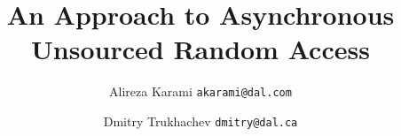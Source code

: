 \documentclass[journal,onecolumn,12pt]{IEEEtran}
\begin{document}
\parindent=5mm

\DeclarePairedDelimiter{\nint}\lfloor\rceil
\newcommand{\beq}{\begin{equation}}
\newcommand{\eeq}{\end{equation}}
\newcommand{\Hb}{\mathbf {H}}
\newcommand{\F}{\mathbf {F}}
\newcommand{\B}{\mathbf {B}}
\newcommand{\I}{\mathbf {I}}
\newcommand{\p}{\boldsymbol {p}}
\newcommand{\bv}{\boldsymbol {b}}
\newcommand{\matr}[1]{{\mathbf{#1}}}
\renewcommand{\vec}[1]{{\boldsymbol{#1}}}
\newcommand{\x}{\boldsymbol {x}}
\newcommand{\n}{\boldsymbol {n}}
\newcommand{\s}{\boldsymbol {s}}
\newcommand{\w}{\boldsymbol {w}}
\newcommand{\vv}{\boldsymbol {v}}
\newcommand{\cx}{\boldsymbol {c}}
\newcommand{\rx}{\boldsymbol {r}}
\newcommand{\y}{\boldsymbol {y}}
\newcommand{\z}{\boldsymbol {z}}
\newcommand{\R}{\mathbf {R}}
\newcommand{\A}{\mathbf {A}}
\newcommand{\mL}{\mathcal{L}}
\newcommand{\raw}{\rightarrow}

\newtheorem{lemma}{Lemma}
\newtheorem{theorem}{Theorem}
\newcommand{\gvect}[1]{{\boldsymbol{#1}}} %
\newcommand{\pound}{\operatornamewithlimits{\#}}
\newcommand{\stxt}[1]{\ensuremath{_{\text{#1}}}}
\renewcommand{\topfraction}{1}	%
\renewcommand{\bottomfraction}{1}	%
\renewcommand{\textfraction}{0}	%
\newcommand{\defeq}{\stackrel{\textrm{def}}{=}}



\title { An Approach to Asynchronous Unsourced Random Access}

\author{
  Alireza Karami \texttt{akarami@dal.com}\\
  \and
  Dmitry Trukhachev \texttt{dmitry@dal.ca}
}

\maketitle
\end{document}
